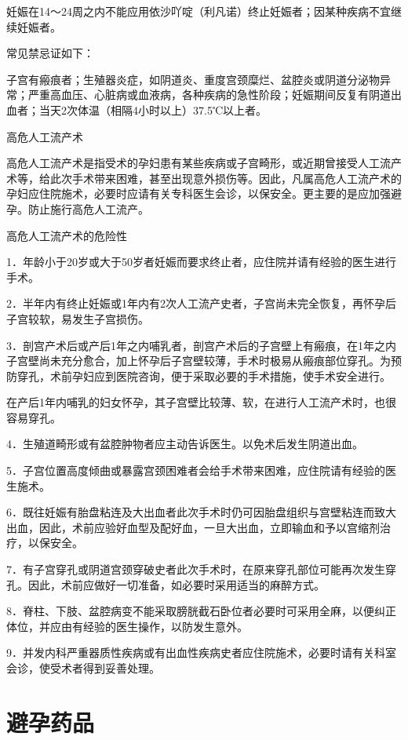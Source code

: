 \documentclass[12pt,UTF8,openany]{ctexbook}
\begin{document}
妊娠在14～24周之内不能应用依沙吖啶（利凡诺）终止妊娠者；因某种疾病不宜继续妊娠者。

常见禁忌证如下：

子宫有瘢痕者；生殖器炎症，如阴道炎、重度宫颈糜烂、盆腔炎或阴道分泌物异常；严重高血压、心脏病或血液病，各种疾病的急性阶段；妊娠期间反复有阴道出血者；当天2次体温（相隔4小时以上）37.5℃以上者。





高危人工流产术


高危人工流产术是指受术的孕妇患有某些疾病或子宫畸形，或近期曾接受人工流产术等，给此次手术带来困难，甚至出现意外损伤等。因此，凡属高危人工流产术的孕妇应住院施术，必要时应请有关专科医生会诊，以保安全。更主要的是应加强避孕。防止施行高危人工流产。

高危人工流产术的危险性

1．年龄小于20岁或大于50岁者妊娠而要求终止者，应住院并请有经验的医生进行手术。

2．半年内有终止妊娠或1年内有2次人工流产史者，子宫尚未完全恢复，再怀孕后子宫较软，易发生子宫损伤。

3．剖宫产术后或产后1年之内哺乳者，剖宫产术后的子宫壁上有瘢痕，在1年之内子宫壁尚未充分愈合，加上怀孕后子宫壁较薄，手术时极易从瘢痕部位穿孔。为预防穿孔，术前孕妇应到医院咨询，便于采取必要的手术措施，使手术安全进行。

在产后1年内哺乳的妇女怀孕，其子宫壁比较薄、软，在进行人工流产术时，也很容易穿孔。

4．生殖道畸形或有盆腔肿物者应主动告诉医生。以免术后发生阴道出血。

5．子宫位置高度倾曲或暴露宫颈困难者会给手术带来困难，应住院请有经验的医生施术。

6．既往妊娠有胎盘粘连及大出血者此次手术时仍可因胎盘组织与宫壁粘连而致大出血，因此，术前应验好血型及配好血，一旦大出血，立即输血和予以宫缩剂治疗，以保安全。

7．有子宫穿孔或阴道宫颈穿破史者此次手术时，在原来穿孔部位可能再次发生穿孔。因此，术前应做好一切准备，如必要时采用适当的麻醉方式。

8．脊柱、下肢、盆腔病变不能采取膀胱截石卧位者必要时可采用全麻，以便纠正体位，并应由有经验的医生操作，以防发生意外。

9．并发内科严重器质性疾病或有出血性疾病史者应住院施术，必要时请有关科室会诊，使受术者得到妥善处理。

\chapter{避孕药品}
\end{document}
